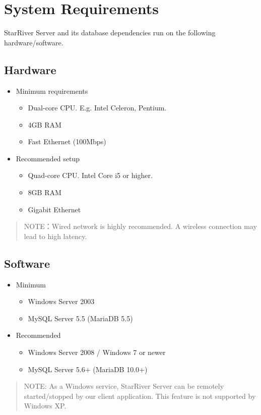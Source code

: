 \section{System Requirements}\label{system-requirements}

StarRiver Server and its database dependencies run on the following
hardware/software.

\subsection{Hardware}\label{hardware}

\begin{itemize}
\itemsep1pt\parskip0pt
\item
  Minimum requirements

  \begin{itemize}
  \itemsep1pt\parskip0pt
  \item
    Dual-core CPU. E.g. Intel Celeron, Pentium.
  \item
    4GB RAM
  \item
    Fast Ethernet (100Mbps)
  \end{itemize}
\item
  Recommended setup

  \begin{itemize}
  \itemsep1pt\parskip0pt
  \item
    Quad-core CPU. Intel Core i5 or higher.
  \item
    8GB RAM
  \item
    Gigabit Ethernet
  \end{itemize}
\end{itemize}

\begin{quote}
NOTE：Wired network is highly recommended. A wireless connection may
lead to high latency.
\end{quote}

\subsection{Software}\label{software}

\begin{itemize}
\itemsep1pt\parskip0pt
\item
  Minimum

  \begin{itemize}
  \itemsep1pt\parskip0pt
  \item
    Windows Server 2003
  \item
    MySQL Server 5.5 (MariaDB 5.5)
  \end{itemize}
\item
  Recommended

  \begin{itemize}
  \itemsep1pt\parskip0pt
  \item
    Windows Server 2008 / Windows 7 or newer
  \item
    MySQL Server 5.6+ (MariaDB 10.0+)
  \end{itemize}
\end{itemize}

\begin{quote}
NOTE: As a Windows service, StarRiver Server can be remotely
started/stopped by our client application. This feature is not supported
by Windows XP.
\end{quote}
